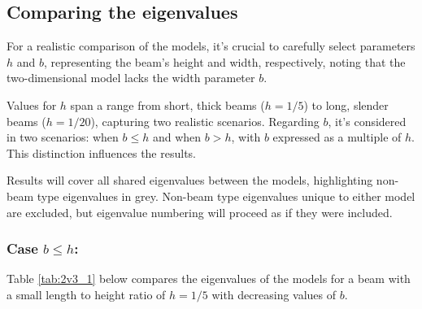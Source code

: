 \subsection{Comparing the eigenvalues}
For a realistic comparison of the models, it's crucial to carefully select parameters $h$ and $b$, representing the beam's height and width, respectively, noting that the two-dimensional model lacks the width parameter $b$.

Values for $h$ span a range from short, thick beams ($h = 1/5$) to long, slender beams ($h = 1/20$), capturing two realistic scenarios. Regarding $b$, it's considered in two scenarios: when $b \leq h$ and when $b > h$, with $b$ expressed as a multiple of $h$. This distinction influences the results.

Results will cover all shared eigenvalues between the models, highlighting non-beam type eigenvalues in grey. Non-beam type eigenvalues unique to either model are excluded, but eigenvalue numbering will proceed as if they were included.

\subsubsection*{Case $b \leq h$:}
Table \ref{tab:2v3_1} below compares the eigenvalues of the models for a beam with a small length to height ratio of $h=1/5$ with decreasing values of $b$. 

